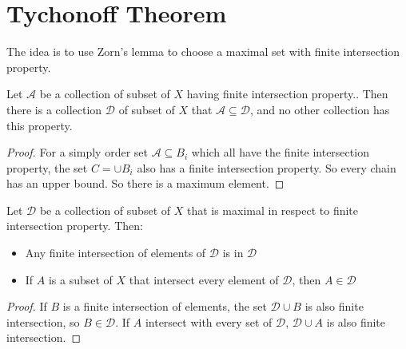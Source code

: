 \section{Tychonoff Theorem}

The idea is to use Zorn's lemma to choose a maximal set with finite intersection property.

\begin{theorem}
    Let $\mathcal{A}$ be a collection of subset of $X$ having finite intersection property.. Then there is a collection $\mathcal{D}$ of subset of $X$ that $\mathcal{A} \subseteq \mathcal{D}$, and no other collection has this property.
\end{theorem}
\begin{proof}
    For a simply order set $\mathcal{A} \subseteq B_i$ which all have the finite intersection property, the set $C = \cup B_i$ also has a finite intersection property. So every chain has an upper bound. So there is a maximum element.
\end{proof}

\begin{theorem}
    Let $\mathcal{D}$ be a collection of subset of $X$ that is maximal in respect to finite intersection property. Then:
    \begin{itemize}
        \item Any finite intersection of elements of $\mathcal{D}$ is in $\mathcal{D}$
        \item If $A$ is a subset of $X$ that intersect every element of $\mathcal{D}$, then $A \in \mathcal{D}$
    \end{itemize}    
\end{theorem}
\begin{proof}
    If $B$ is a finite intersection of elements, the set $\mathcal{D} \cup B$ is also finite intersection, so $B \in \mathcal{D}$. If $A$ intersect with every set of $\mathcal{D}$, $\mathcal{D} \cup {A}$ is also finite intersection.
\end{proof}

